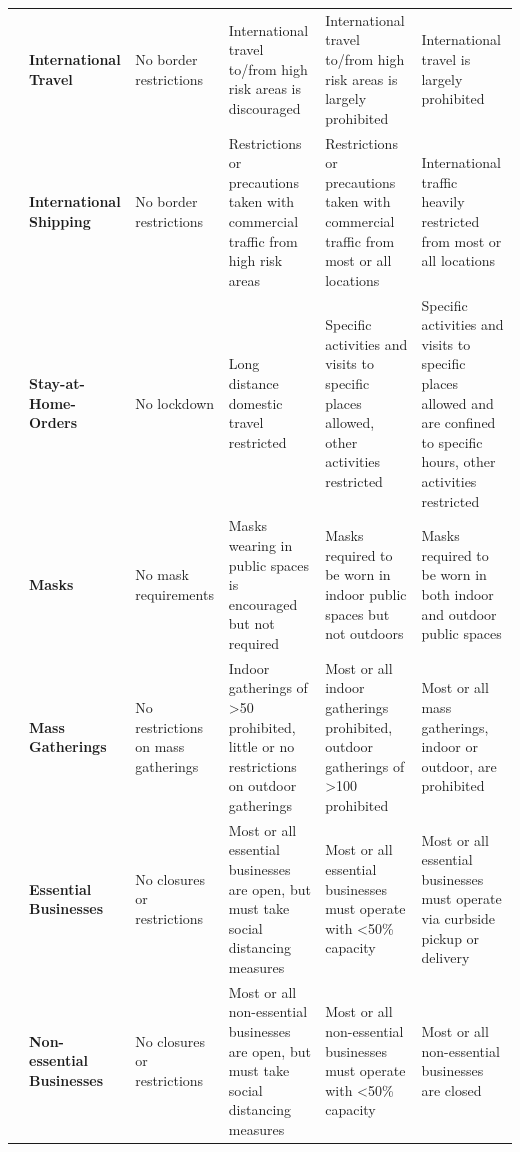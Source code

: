 \begin{landscape}
\begin{longtable}{| C{2cm} |  C{2cm} |C{3cm} |C{3cm} |C{3cm} |C{3cm}|}
& \textbf{International Travel} & No border restrictions & International travel to/from high risk areas is discouraged & International travel to/from high risk areas is largely prohibited & International travel is largely prohibited \\ 

& \textbf{International Shipping} & No border restrictions & Restrictions or precautions taken with commercial traffic from high risk areas & Restrictions or precautions taken with commercial traffic from most or all locations & International traffic heavily restricted from most or all locations \\  \hline


 & \textbf{Stay-at-Home-Orders} & No lockdown & Long distance domestic travel restricted & Specific activities and visits to specific places allowed, other activities restricted & Specific activities and visits to specific places allowed and are confined to specific hours, other activities restricted \\* 

& \textbf{Masks} & No mask requirements & Masks wearing in public spaces is encouraged but not required & Masks required to be worn in indoor public spaces but not outdoors & Masks required to be worn in both indoor and outdoor public spaces \\* 

& \textbf{Mass Gatherings} & No restrictions on mass gatherings & Indoor gatherings of >50 prohibited, little or no restrictions on outdoor gatherings & Most or all indoor gatherings prohibited, outdoor gatherings of >100 prohibited & Most or all mass gatherings, indoor or outdoor, are prohibited \\* \hline



 & \textbf{Essential Businesses} & No closures or restrictions & Most or all essential businesses are open, but must take social distancing measures & Most or all essential businesses must operate with <50\% capacity & Most or all essential businesses must operate via curbside pickup or delivery \\* 

& \textbf{Non-essential Businesses} & No closures or restrictions & Most or all non-essential businesses are open, but must take social distancing measures & Most or all non-essential businesses must operate with <50\% capacity & Most or all non-essential businesses are closed \\ \bottomrule



\end{longtable}
\end{landscape}



